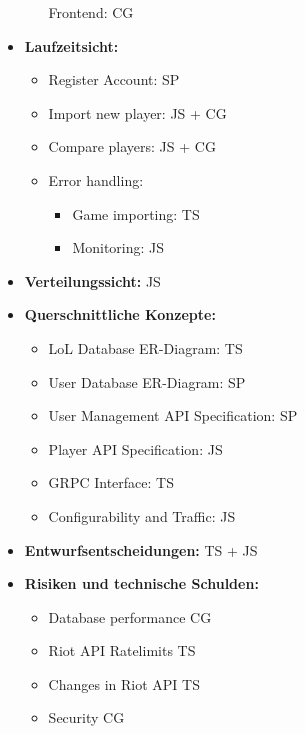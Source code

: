 \begin{itemize}
\begin{itemize}
	Frontend: CG
\end{itemize}
\item
\textbf{Laufzeitsicht:}
\begin{itemize}
	\item
	Register Account: SP
	\item
	Import new player: JS + CG
	\item
	Compare players: JS + CG
	\item
	Error handling:
	\begin{itemize}
		\item
		Game importing: TS
		\item
		Monitoring: JS
	\end{itemize}
\end{itemize}
\item
\textbf{Verteilungssicht:} JS
\item
\textbf{Querschnittliche Konzepte:}
\begin{itemize}
	\item
	LoL Database ER-Diagram: TS
	\item
	User Database ER-Diagram: SP
	\item
	User Management API Specification: SP
	\item
	Player API Specification: JS
	\item
	GRPC Interface: TS
	\item
	Configurability and Traffic: JS
\end{itemize}
\item
\textbf{Entwurfsentscheidungen:} TS + JS
\item
\textbf{Risiken und technische Schulden:}
\begin{itemize}
	\item
	Database performance CG
	\item
	Riot API Ratelimits TS
	\item
	Changes in Riot API TS
	\item
	Security CG
\end{itemize}
\end{itemize}